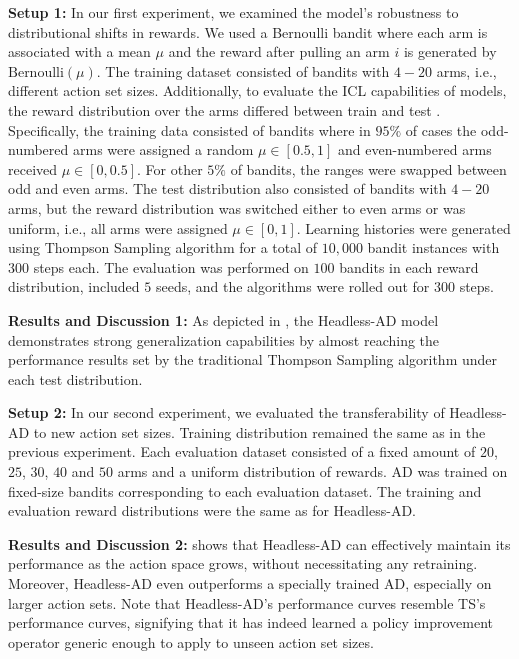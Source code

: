 \textbf{Setup 1:} In our first experiment, we examined the model's robustness to distributional shifts in rewards. We used a Bernoulli bandit where each arm is associated with a mean $\mu$ and the reward after pulling an arm $i$ is generated by $\text{Bernoulli}(\mu)$. The training dataset consisted of bandits with $4-20$ arms, i.e., different action set sizes. Additionally, to evaluate the ICL capabilities of models, the reward distribution over the arms differed between train and test \citep{laskin2022context}. Specifically, the training data consisted of bandits where in $95\%$ of cases the odd-numbered arms were assigned a random $\mu \in [0.5, 1]$ and even-numbered arms received $\mu \in [0, 0.5]$. For other $5\%$ of bandits, the ranges were swapped between odd and even arms. The test distribution also consisted of bandits with $4-20$ arms, but the reward distribution was switched either to even arms or was uniform, i.e., all arms were assigned $\mu \in [0, 1]$. Learning histories were generated using Thompson Sampling algorithm for a total of $10,000$ bandit instances with $300$ steps each. The evaluation was performed on $100$ bandits in each reward distribution, included $5$ seeds, and the algorithms were rolled out for $300$ steps.

\textbf{Results and Discussion 1:} As depicted in , the Headless-AD model demonstrates strong generalization capabilities by almost reaching the performance results set by the traditional Thompson Sampling algorithm under each test distribution. 

\textbf{Setup 2:} In our second experiment, we evaluated the transferability of Headless-AD to new action set sizes. Training distribution remained the same as in the previous experiment. Each evaluation dataset consisted of a fixed amount of $20$, $25$, $30$, $40$ and $50$ arms and a uniform distribution of rewards. AD was trained on fixed-size bandits corresponding to each evaluation dataset. The training and evaluation reward distributions were the same as for Headless-AD.

\textbf{Results and Discussion 2:}  shows that Headless-AD can effectively maintain its performance as the action space grows, without necessitating any retraining. Moreover, Headless-AD even outperforms a specially trained AD, especially on larger action sets. Note that Headless-AD's performance curves resemble TS's performance curves, signifying that it has indeed learned a policy improvement operator generic enough to apply to unseen action set sizes.

